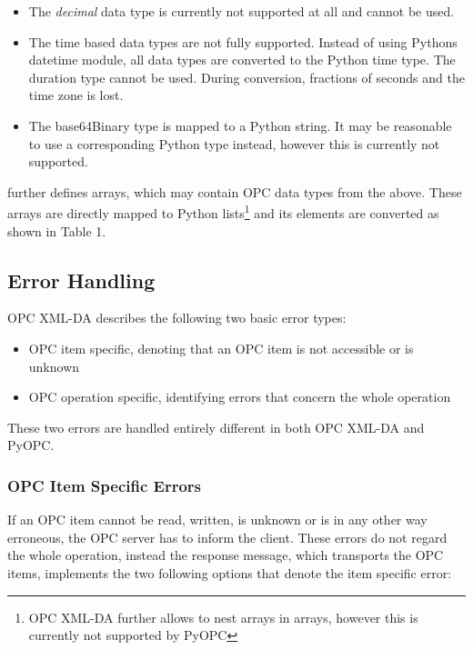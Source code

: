 \begin{itemize}
\item The {\sl decimal} data type is currently not supported at all and
cannot be used.
\item The time based data types are not fully supported. Instead of
using Pythons datetime module, all data types are converted to the
Python time type. The duration type cannot be used. During conversion,
fractions of seconds and the time zone is lost.
\item The base64Binary type is mapped to a Python string. It may be
reasonable to use a corresponding Python type instead, however this is
currently not supported.
\end{itemize}

\cite{OPCXMLDA} further defines arrays, which may contain OPC data
types from the above. These arrays are directly mapped to Python
lists\footnote{OPC XML-DA further allows to nest arrays in arrays,
however this is currently not supported by PyOPC} and its elements are
converted as shown in Table 1.

\subsection{Error Handling}

OPC XML-DA describes the following two basic error types:

\begin{itemize}
\item OPC item specific, denoting that an OPC item is not
accessible or is unknown
\item OPC operation specific, identifying errors that concern the
whole operation
\end{itemize}

These two errors are handled entirely different in both OPC XML-DA and
PyOPC.

\subsubsection*{OPC Item Specific Errors}

If an OPC item cannot be read, written, is unknown or is in any other
way erroneous, the OPC server has to inform the client. These errors
do not regard the whole operation, instead the response message, which
transports the OPC items, implements the two following options that
denote the item specific error:

